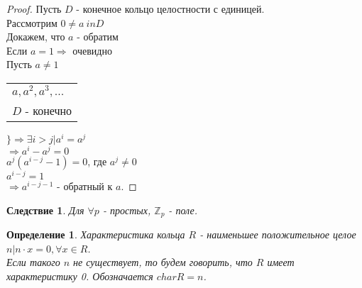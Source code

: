 \documentclass[10pt,a4paper]{article}
\newtheorem{definition}{Определение}
\newtheorem{corollary}{Следствие}
\newcommand*{\Z}{\mathbb{Z}}
\begin{document}
			\begin{proof}
				Пусть $D$ - конечное кольцо целостности с единицей.\\
				Рассмотрим $0 \neq a \ in D$\\
				Докажем, что $a$ - обратим\\
				Если $a = 1 \Rightarrow$ очевидно\\
				Пусть $a \neq 1$\\
				\begin{tabular}{l}
				$a, a^2, a^3, ...$\\
				$D$ - конечно			
				\end{tabular}
				$\Big\} \Rightarrow \exists i > j \big| a^i = a^j$\\
				$\Rightarrow a^i - a^j = 0$\\
				$a^j(a^{i-j}-1) = 0$, где $a^j \neq 0$\\
				$a^{i-j} = 1$\\
				$\Rightarrow a^{i-j-1}$ - обратный к $a$.
			\end{proof}
			\begin{corollary}
				Для $\forall p$ - простых, $\Z_p$ - поле.
			\end{corollary}
			\begin{definition}
				Характеристика кольца $R$ - наименьшее положительное целое $n \big| n \cdot x = 0, \forall x \in R$.\\
				Если такого $n$ не существует, то будем говорить, что $R$ имеет характеристику 0. Обозначается $char R = n$.
			\end{definition}
\end{document}
